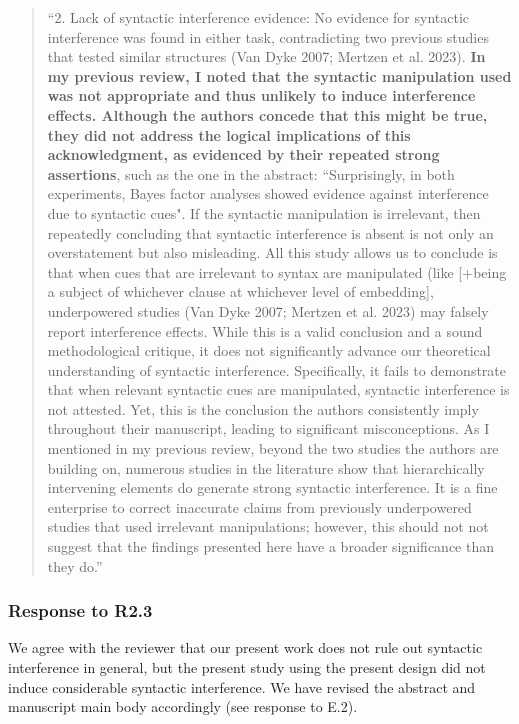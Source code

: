 \documentclass[12pt]{article}
\begin{document}
\begin{quote}
``2. Lack of syntactic interference evidence: No evidence for syntactic interference was found in either task, contradicting two previous studies that tested similar structures (Van Dyke 2007; Mertzen et al. 2023). \textbf{In my previous review, I noted that the syntactic manipulation used was not appropriate and thus unlikely to induce interference effects. Although the authors concede that this might be true, they did not address the logical implications of this acknowledgment, as evidenced by their repeated strong assertions}, such as the one in the abstract: ``Surprisingly, in both experiments, Bayes factor analyses showed evidence against interference due to syntactic cues".
If the syntactic manipulation is irrelevant, then repeatedly concluding that syntactic interference is absent is not only an overstatement but also misleading. All this study allows us to conclude is that when cues that are irrelevant to syntax are manipulated (like [+being a subject of whichever clause at whichever level of embedding], underpowered studies (Van Dyke 2007; Mertzen et al. 2023) may falsely report interference effects. While this is a valid conclusion and a sound methodological critique, it does not significantly advance our theoretical understanding of syntactic interference. Specifically, it fails to demonstrate that when relevant syntactic cues are manipulated, syntactic interference is not attested. Yet, this is the conclusion the authors consistently imply throughout their manuscript, leading to significant misconceptions. As I mentioned in my previous review, beyond the two studies the authors are building on, numerous studies in the literature show that hierarchically intervening elements do generate strong syntactic interference.
It is a fine enterprise to correct inaccurate claims from previously underpowered studies that used irrelevant manipulations; however, this should not not suggest that the findings presented here have a broader significance than they do.''
\end{quote}
\subsubsection*{Response to R2.3}
We agree with the reviewer that our present work does not rule out syntactic interference in general, but the present study using the present design did not induce considerable syntactic interference. We have revised the abstract and manuscript main body accordingly (see response to E.2). 
 
\end{document}

